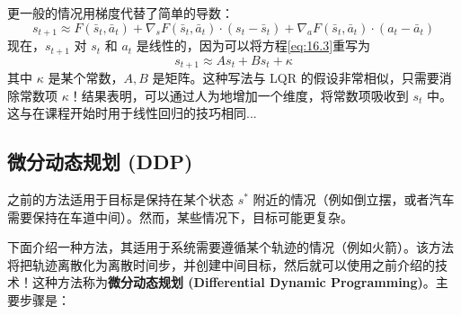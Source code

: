 更一般的情况用梯度代替了简单的导数：
\begin{equation} \label{eq:16.3}
    s_{t+1} \approx F(\bar{s}_t, \bar{a}_t) + \nabla_s F(\bar{s}_t, \bar{a}_t) \cdot (s_t - \bar{s}_t) + \nabla_a F(\bar{s}_t, \bar{a}_t) \cdot (a_t - \bar{a}_t)
\end{equation}
现在，$s_{t+1}$ 对 $s_t$ 和 $a_t$ 是线性的，因为可以将方程\eqref{eq:16.3}重写为
\[
    s_{t+1} \approx A s_t + B s_t + \kappa
\]
其中 $\kappa$ 是某个常数，$A, B$ 是矩阵。这种写法与 LQR 的假设非常相似，只需要消除常数项 $\kappa$！结果表明，可以通过人为地增加一个维度，将常数项吸收到 $s_t$ 中。这与在课程开始时用于线性回归的技巧相同...

\subsection{微分动态规划 (DDP)}

之前的方法适用于目标是保持在某个状态 $s^*$ 附近的情况（例如倒立摆，或者汽车需要保持在车道中间）。然而，某些情况下，目标可能更复杂。

下面介绍一种方法，其适用于系统需要遵循某个轨迹的情况（例如火箭）。该方法将把轨迹离散化为离散时间步，并创建中间目标，然后就可以使用之前介绍的技术！这种方法称为\textbf{微分动态规划 (Differential Dynamic Programming)}。主要步骤是：

